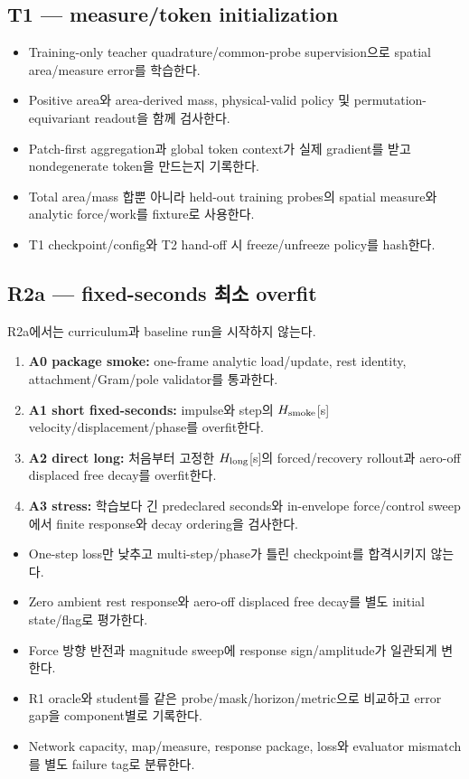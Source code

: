 \documentclass[10pt]{article}
\begin{document}
\subsection{T1 --- measure/token initialization}

\begin{itemize}
  \item[$\square$] Training-only teacher quadrature/common-probe supervision으로 spatial area/measure error를 학습한다.
  \item[$\square$] Positive area와 area-derived mass, physical-valid policy 및 permutation-equivariant readout을 함께 검사한다.
  \item[$\square$] Patch-first aggregation과 global token context가 실제 gradient를 받고 nondegenerate token을 만드는지 기록한다.
  \item[$\square$] Total area/mass 합뿐 아니라 held-out training probes의 spatial measure와 analytic force/work를 fixture로 사용한다.
  \item[$\square$] T1 checkpoint/config와 T2 hand-off 시 freeze/unfreeze policy를 hash한다.
\end{itemize}

\subsection{R2a --- fixed-seconds 최소 overfit}

R2a에서는 curriculum과 baseline run을 시작하지 않는다.
\begin{enumerate}
  \item \textbf{A0 package smoke:} one-frame analytic load/update, rest identity, attachment/Gram/pole validator를 통과한다.
  \item \textbf{A1 short fixed-seconds:} impulse와 step의 \(H_{\rm smoke}\)[s] velocity/displacement/phase를 overfit한다.
  \item \textbf{A2 direct long:} 처음부터 고정한 \(H_{\rm long}\)[s]의 forced/recovery rollout과
  aero-off displaced free decay를 overfit한다.
  \item \textbf{A3 stress:} 학습보다 긴 predeclared seconds와 in-envelope force/control sweep에서 finite response와 decay ordering을 검사한다.
\end{enumerate}

\begin{itemize}
  \item[$\square$] One-step loss만 낮추고 multi-step/phase가 틀린 checkpoint를 합격시키지 않는다.
  \item[$\square$] Zero ambient rest response와 aero-off displaced free decay를 별도 initial state/flag로 평가한다.
  \item[$\square$] Force 방향 반전과 magnitude sweep에 response sign/amplitude가 일관되게 변한다.
  \item[$\square$] R1 oracle와 student를 같은 probe/mask/horizon/metric으로 비교하고 error gap을 component별로 기록한다.
  \item[$\square$] Network capacity, map/measure, response package, loss와 evaluator mismatch를 별도 failure tag로 분류한다.
\end{itemize}
\end{document}
